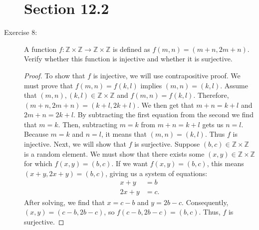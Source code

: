 \documentclass[12pt]{article}
\begin{document}
\begin{description}
\section*{Section 12.2}
\item[Exercise 8:] A function $f:\mathbb{Z} \times \mathbb{Z} \to \mathbb{Z} \times \mathbb{Z}$ is defined as $f(m,n) = (m+n,2m+n)$. Verify whether this function is injective and whether it is surjective.
\begin{spacing}{2}
\begin{proof}
To show that $f$ is injective, we will use contrapositive proof. We must prove that $f(m,n)=f(k,l)$ implies $(m,n)=(k,l)$. Assume that $(m,n),(k,l) \in \mathbb{Z} \times \mathbb{Z}$ and $f(m,n)=f(k,l)$. Therefore, $(m+n,2m+n) = (k+l,2k+l)$. We then get that $m+n = k+l$ and $2m+n = 2k+l$. By subtracting the first equation from the second we find that $m=k$. Then, subtracting $m=k$ from $m+n = k+l$ gets us $n=l$. Because $m=k$ and $n=l$, it means that $(m,n)=(k,l)$. Thus $f$ is injective.
\newline
Next, we will show that $f$ is surjective. Suppose $(b,c) \in \mathbb{Z} \times \mathbb{Z}$ is a random element. We must show that there exists some $(x,y) \in \mathbb{Z} \times \mathbb{Z}$ for which $f(x,y) = (b,c)$. If we want $f(x,y) = (b,c)$, this means $(x+y,2x+y) = (b,c)$, giving us a system of equations:
\begin{align*}
    x + y &= b \\
    2x + y &= c.
\end{align*}
After solving, we find that $x= c-b$ and $y = 2b- c$. Consequently, $(x,y) = (c-b,2b-c)$, so $f(c-b,2b-c)=(b,c)$. Thus, $f$ is surjective.
\end{proof}
\end{spacing} 


\end{description}
\end{document}

